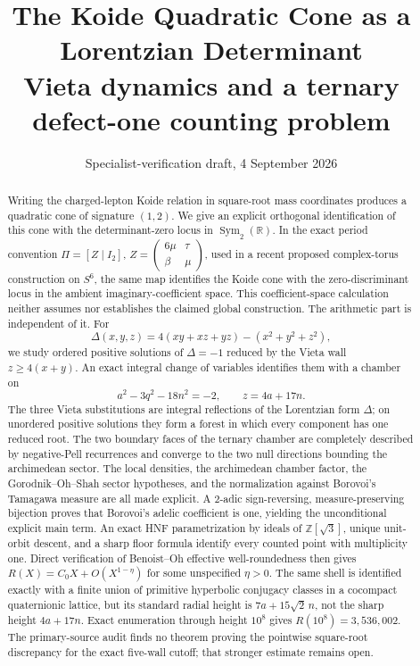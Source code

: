 \documentclass[11pt]{article}
\title{The Koide Quadratic Cone as a Lorentzian Determinant\\
\large Vieta dynamics and a ternary defect-one counting problem}
\author{}
\date{Specialist-verification draft, 4 September 2026}
\numberwithin{equation}{section}
\theoremstyle{definition}
\theoremstyle{remark}
\newcommand{\R}{\mathbb R}
\begin{document}
\maketitle

\begin{abstract}
Writing the charged-lepton Koide relation in square-root mass coordinates produces a quadratic cone of signature $(1,2)$.  We give an explicit orthogonal identification of this cone with the determinant-zero locus in $\operatorname{Sym}_2(\R)$.  In the exact period convention $\Pi=[Z\mid I_2]$, $Z=\left(\begin{smallmatrix}6\mu&\tau\\ \beta&\mu\end{smallmatrix}\right)$, used in a recent proposed complex-torus construction on $S^6$, the same map identifies the Koide cone with the zero-discriminant locus in the ambient imaginary-coefficient space.  This coefficient-space calculation neither assumes nor establishes the claimed global construction.  The arithmetic part is independent of it.  For
\[
 \Delta(x,y,z)=4(xy+xz+yz)-(x^2+y^2+z^2),
\]
we study ordered positive solutions of $\Delta=-1$ reduced by the Vieta wall $z\geq4(x+y)$.  An exact integral change of variables identifies them with a chamber on
\[
 a^2-3q^2-18n^2=-2,
 \qquad z=4a+17n.
\]
The three Vieta substitutions are integral reflections of the Lorentzian
form $\Delta$; on unordered positive solutions they form a forest in which
every component has one reduced root.  The two boundary faces of the ternary
chamber are completely described by negative-Pell recurrences and converge
to the two null directions bounding the archimedean sector.
The local densities, the archimedean chamber factor, the Gorodnik--Oh--Shah
sector hypotheses, and the normalization against Borovoi's Tamagawa measure
are all made explicit.  A $2$-adic sign-reversing, measure-preserving
bijection proves that Borovoi's adelic coefficient is one, yielding the
unconditional explicit main term.  An exact HNF parametrization by ideals of
$\mathbb Z[\sqrt3]$, unique unit-orbit descent, and a sharp floor formula
identify every counted point with multiplicity one.  Direct verification of
Benoist--Oh effective well-roundedness then gives
$R(X)=C_0X+O(X^{1-\eta})$ for some unspecified $\eta>0$.  The same shell is
identified exactly with a finite union of primitive hyperbolic conjugacy
classes in a cocompact quaternionic lattice, but its standard radial height
is $7a+15\sqrt2\,n$, not the sharp height $4a+17n$.  Exact enumeration through
height $10^8$ gives $R(10^8)=3{,}536{,}002$.  The primary-source audit finds
no theorem proving the pointwise square-root discrepancy for the exact
five-wall cutoff; that stronger estimate remains open.
\end{abstract}
\end{document}
